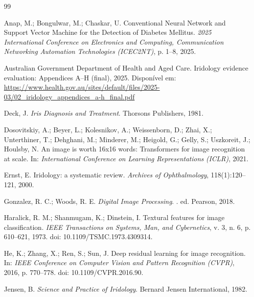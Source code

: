 \documentclass[11pt,a4paper]{article}
\begin{document}
\newpage
\begin{thebibliography}{99}

Anap, M.; Bongulwar, M.; Chaskar, U.
\newblock Conventional Neural Network and Support Vector Machine for the Detection of Diabetes Mellitus.
\newblock \emph{2025 International Conference on Electronics and Computing, Communication Networking Automation Technologies (ICEC2NT)}, p. 1--8, 2025.

Australian Government Department of Health and Aged Care.
\newblock Iridology evidence evaluation: Appendices A--H (final), 2025.
\newblock Disponível em: \url{https://www.health.gov.au/sites/default/files/2025-03/02_iridology_appendices_a-h_final.pdf}

Deck, J.
\newblock \emph{Iris Diagnosis and Treatment}.
\newblock Thorsons Publishers, 1981.

Dosovitskiy, A.; Beyer, L.; Kolesnikov, A.; Weissenborn, D.; Zhai, X.; Unterthiner, T.; Dehghani, M.; Minderer, M.; Heigold, G.; Gelly, S.; Uszkoreit, J.; Houlsby, N.
\newblock An image is worth 16x16 words: Transformers for image recognition at scale.
\newblock In: \emph{International Conference on Learning Representations (ICLR)}, 2021.

Ernst, E.
\newblock Iridology: a systematic review.
\newblock \emph{Archives of Ophthalmology}, 118(1):120--121, 2000.

Gonzalez, R. C.; Woods, R. E.
\newblock \emph{Digital Image Processing}.
. ed.
\newblock Pearson, 2018.

Haralick, R. M.; Shanmugam, K.; Dinstein, I.
\newblock Textural features for image classification.
\newblock \emph{IEEE Transactions on Systems, Man, and Cybernetics}, v. 3, n. 6, p. 610--621, 1973.
\newblock doi: 10.1109/TSMC.1973.4309314.

He, K.; Zhang, X.; Ren, S.; Sun, J.
\newblock Deep residual learning for image recognition.
\newblock In: \emph{IEEE Conference on Computer Vision and Pattern Recognition (CVPR)}, 2016, p. 770--778.
\newblock doi: 10.1109/CVPR.2016.90.

Jensen, B.
\newblock \emph{Science and Practice of Iridology}.
\newblock Bernard Jensen International, 1982.


\end{thebibliography}
\end{document}

